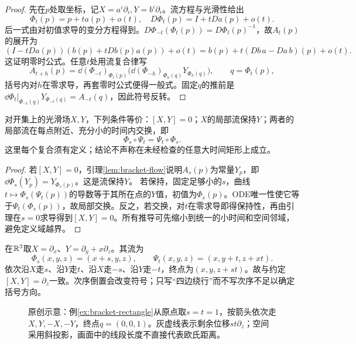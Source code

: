 \begin{proof}
先在$p$处取坐标，记$X=a^i\partial_i,Y=b^i\partial_i$。流方程与光滑性给出
\[
 \Phi_t(p)=p+ta(p)+o(t),\quad
 D\Phi_t(p)=I+tDa(p)+o(t).
\]
后一式由对初值求导的变分方程得到。$D\Phi_{-t}(\Phi_t(p))=D\Phi_t(p)^{-1}$，故$A_t(p)$的展开为
\[
 (I-tDa(p))(b(p)+tDb(p)a(p))+o(t)
 =b(p)+t(Db\,a-Da\,b)(p)+o(t).
\]
这证明零时公式。任意$t$处用流复合律写
\[
 A_{t+h}(p)=\dd(\Phi_{-t})_{\Phi_t(p)}
 \bigl(\dd(\Phi_{-h})_{\Phi_h(q)}Y_{\Phi_h(q)}\bigr),\qquad q=\Phi_t(p),
\]
括号内对$h$在零求导，再套零时公式便得一般式。固定$q$的推前是$\dd\Phi_t|_{\Phi_{-t}(q)}Y_{\Phi_{-t}(q)}=A_{-t}(q)$，因此符号反转。
\end{proof}
\begin{theorem}[括号为零与局部流交换]\label{thm:commuting-flows}
对开集上的光滑场$X,Y$，下列条件等价：$[X,Y]=0$；$X$的局部流保持$Y$；两者的局部流在每点附近、充分小的时间内交换，即
\[
 \Phi_s\circ\Psi_t=\Psi_t\circ\Phi_s.
\]
这里每个复合须有定义；结论不声称在未经检查的任意大时间矩形上成立。
\end{theorem}
\begin{proof}
若$[X,Y]=0$，引理\ref{lem:bracket-flow}说明$A_s(p)$为常量$Y_p$，即$\dd\Phi_s(Y_p)=Y_{\Phi_s(p)}$。这是流保持$Y$。
若保持，固定足够小的$s$，曲线$t\mapsto\Phi_s(\Psi_t(p))$的导数等于其所在点的$Y$值，初值为$\Phi_s(p)$。ODE唯一性使它等于$\Psi_t(\Phi_s(p))$，故局部交换。反之，若交换，对$t$在零求导即得保持性，再由引理在$s=0$求导得到$[X,Y]=0$。所有推导可先缩小到统一的小时间和空间邻域，避免定义域越界。
\end{proof}
\begin{example}[交换矩形的剩余位移]\label{ex:bracket-rectangle}
在$\mathbb{R}^3$取$X=\partial_x$、$Y=\partial_y+x\partial_z$。其流为
\[
 \Phi_s(x,y,z)=(x+s,y,z),\qquad
 \Psi_t(x,y,z)=(x,y+t,z+xt).
\]
依次沿$X$走$s$、沿$Y$走$t$、沿$X$走$-s$、沿$Y$走$-t$，终点为$(x,y,z+st)$。故与约定$[X,Y]=\partial_z$一致。次序倒置会改变符号；只写“四边绕行”而不写次序不足以确定括号方向。
\end{example}
\begin{figure}[htbp]
\centering
\caption{原创示意：例\ref{ex:bracket-rectangle}从原点取$s=t=1$，按箭头依次走$X,Y,-X,-Y$，终点$q=(0,0,1)$。灰虚线表示剩余位移$st\partial_z$；空间采用斜投影，画面中的线段长度不直接代表欧氏距离。}
\label{fig:bracket-loop}
\end{figure}
